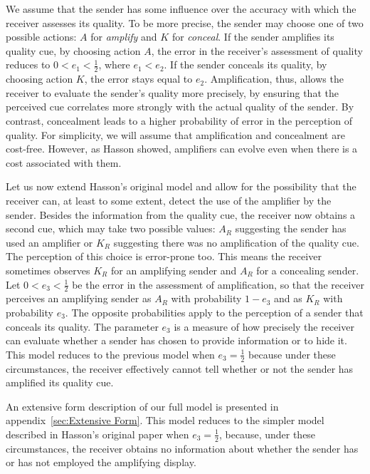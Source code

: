 \documentclass[a4paper,12pt]{article}
\numberwithin{equation}{section}
\begin{document}
We assume that the sender has some influence over the accuracy with which the receiver assesses its quality. To be more precise, the sender may choose one of two possible actions: $A$ for \textit{amplify} and $K$ for \textit{conceal}. If the sender amplifies its quality cue, by choosing action $A$, the error in the receiver's assessment of quality reduces to $0<e_{1}<\frac{1}{2}$, where $e_{1}<e_{2}$. If the sender conceals its quality, by choosing action $K$, the error stays equal to $e_{2}$. Amplification, thus, allows the receiver to evaluate the sender's quality more precisely, by ensuring that the perceived cue correlates more strongly with the actual quality of the sender. By contrast, concealment leads to a higher probability of error in the perception of quality. For simplicity, we will assume that amplification and concealment are cost-free. However, as Hasson showed, amplifiers can evolve even when there is a cost associated with them.

Let us now extend Hasson's original model and allow for the possibility that the receiver can, at least to some extent, detect the use of the amplifier by the sender. Besides the information from the quality cue, the receiver now obtains a second cue, which may take two possible values: $A_{R}$ suggesting the sender has used an amplifier or $K_{R}$ suggesting there was no amplification of the quality cue. The perception of this choice is error-prone too. This means the receiver sometimes observes $K_{R}$ for an amplifying sender and $A_{R}$ for a concealing sender. Let $0<e_{3}<\frac{1}{2}$ be the error in the assessment of amplification, so that the receiver perceives an amplifying sender as $A_{R}$ with probability $1-e_{3}$ and as $K_{R}$ with probability $e_{3}$. The opposite probabilities apply to the perception of a sender that conceals its quality. The parameter $e_{3}$ is a measure of how precisely the receiver can evaluate whether a sender has chosen to provide information or to hide it. This model reduces to the previous model when $e_{3} = \frac{1}{2}$ because under these circumstances, the receiver effectively cannot tell whether or not the sender has amplified its quality cue.

An extensive form description of our full model is presented in appendix~\ref{sec:Extensive Form}. This model reduces to the simpler model described in Hasson's original paper when $e_{3} = \frac{1}{2}$, because, under these circumstances, the receiver obtains no information about whether the sender has or has not employed the amplifying display.
\end{document}
